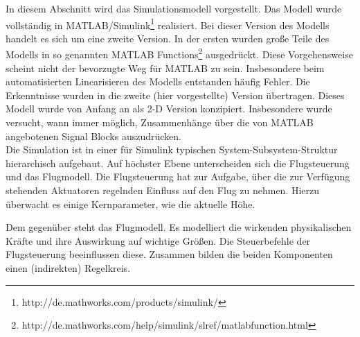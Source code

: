In diesem Abschnitt wird das Simulationsmodell vorgestellt. Das Modell wurde vollständig in MATLAB/Simulink\footnote{http://de.mathworks.com/products/simulink/} realisiert. Bei dieser Version des Modells handelt es sich um eine zweite Version. In der ersten wurden große Teile des Modells in so genannten MATLAB Functions\footnote{http://de.mathworks.com/help/simulink/slref/matlabfunction.html} ausgedrückt. Diese Vorgehensweise scheint nicht der bevorzugte Weg für MATLAB zu sein. Insbesondere beim automatisierten Linearisieren des Modells entstanden häufig Fehler. Die Erkenntnisse wurden in die zweite (hier vorgestellte) Version übertragen. Dieses Modell wurde von Anfang an als 2-D Version konzipiert. Insbesondere wurde versucht, wann immer möglich, Zusammenhänge über die von MATLAB angebotenen Signal Blocks auszudrücken.\\

Die Simulation ist in einer für Simulink typischen System-Subsystem-Struktur hierarchisch aufgebaut. Auf höchster Ebene unterscheiden sich die Flugsteuerung und das Flugmodell. Die Flugsteuerung hat zur Aufgabe, über die zur Verfügung stehenden Aktuatoren regelnden Einfluss auf den Flug zu nehmen. Hierzu überwacht es einige Kernparameter, wie die aktuelle Höhe.

Dem gegenüber steht das Flugmodell. Es modelliert die wirkenden physikalischen Kräfte und ihre Auswirkung auf wichtige Größen. Die Steuerbefehle der Flugsteuerung beeinflussen diese. Zusammen bilden die beiden Komponenten einen (indirekten) Regelkreis.
